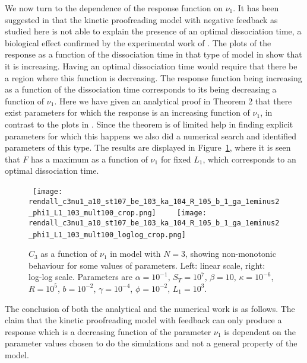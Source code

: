 \documentclass{article}
\begin{document}
We now turn to the dependence of the response function on $\nu_1$.
It has been suggested in \cite{lever14} that the kinetic proofreading model 
with negative feedback as studied here is not able to explain the presence of 
an optimal dissociation time, a biological effect confirmed by the 
experimental work of \cite{lever16}. The plots of the response as a function 
of the dissociation time in that type of model in \cite{lever14} show that it 
is increasing. Having an optimal dissociation time would require that there be 
a region where this function is decreasing. The response function being 
increasing as a function of the dissociation time corresponds to its being 
decreasing a function of $\nu_1$. Here we have given an analytical proof in 
Theorem 2 that there exist parameters for which the response is an increasing 
function of $\nu_1$, in contrast to the plots in \cite{lever14}. Since the 
theorem is of limited help in finding explicit parameters for which 
this happens we also did a numerical search and identified parameters
of this type. The results are displayed in Figure~\ref{fig:c3nu1}, where it is seen that 
$F$ has a maximum as a function of $\nu_1$ for fixed $L_1$, which 
corresponds to an optimal dissociation time.
\begin{figure}[ht]
\begin{center}
  \mbox{%
    \texttt{[image: rendall\_c3nu1\_a10\_st107\_be\_103\_ka\_104\_R\_105\_b\_1\_ga\_1eminus2\_phi1\_L1\_103\_mult100\_crop.png]}%
\ \ \ %
\texttt{[image: rendall\_c3nu1\_a10\_st107\_be\_103\_ka\_104\_R\_105\_b\_1\_ga\_1eminus2\_phi1\_L1\_103\_mult100\_loglog\_crop.png]}
}%
\end{center}
\caption{%
  $C_3$ as a function of $\nu_1$ in model with $N=3$, showing non-monotonic
  behaviour for some values of parameters.
  Left: linear scale, right: log-log scale.
Parameters are
$\alpha =  10^{-1}$, %
$S_T =  10^7$, %
$\beta =  10$,
$\kappa = 10^{-6}$, %
$R =  10^5$, %
$b =   10^{-2}$, %
$\gamma =  10^{-4}$, %
$\phi = 10^{-2}$, %
$L_1 = 10^3$. %
}
\label{fig:c3nu1}
\end{figure}
The conclusion of both the 
analytical and the numerical work is as follows. The claim that the kinetic 
proofreading model with feedback can only produce a response which is a 
decreasing function of the parameter $\nu_1$ is dependent on the parameter 
values chosen to do the simulations and not a general property of the model.
\end{document}
